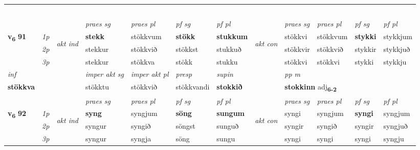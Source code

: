 \begin{longtable}[l]{X>{\footnotesize\itshape}llXXXXlXXXX}
\midrule
  & \\*
   & \\*
     & \\*
   & \\*
  & \\
   \midrule
 & &   & \textit{praes sg}  & \textit{praes pl}    & \textit{ pf sg} & \textit{pf pl} & & \textit{praes sg}  & \textit{praes pl}    & \textit{pf sg} & \textit{pf pl }  \\ \cmidrule{4-7} \cmidrule{9-12}
 \multirow{2}{*}{{{\textbf{v{\textsubscript{6}}} \Large{\textbf{91}}}}}  & 1p & \multirow{3}{*}{\begin{turn}{90}\textit{akt ind}\end{turn}} & \textbf{stekk} & stökkvum & \textbf{stökk} & \textbf{stukkum} & \multirow{3}{*}{\begin{turn}{90}\textit{akt con}\end{turn}} &stökkvi & stökkvum & \textbf{stykki} & stykkjum\\*
 & 2p &  &  stekkur  & stökkvið & stökkst & stukkuð & & stökkvir & stökkvið & stykkir & stykkjuð \\*
 & 3p &  & stekkur & stökkva & stökk & stukku & & stökkvi & stökkvi& stykki & stykkju \\*
\cmidrule{4-7} \cmidrule{9-12}

   {\textit{inf}} & &  & \textit{imper akt sg} & \textit{imper akt pl}   & \textit{presp} & \textit{supin}  && \textit{pp m} \\*
  {\textbf{stökkva}} & && stökktu  & stökkvið   & stökkvandi &  \textbf{stokkið}  && \multicolumn{2}{l}{\textbf{stokkinn} adj\textbf{\textsubscript{6-2}}} \\*

\midrule

 & &   & \textit{praes sg}  & \textit{praes pl}    & \textit{ pf sg} & \textit{pf pl} & & \textit{praes sg}  & \textit{praes pl}    & \textit{pf sg} & \textit{pf pl }  \\ \cmidrule{4-7} \cmidrule{9-12}
 \multirow{2}{*}{{{\textbf{v{\textsubscript{6}}} \Large{\textbf{92}}}}}  & 1p & \multirow{3}{*}{\begin{turn}{90}\textit{akt ind}\end{turn}} & \textbf{syng} & syngjum & \textbf{söng} & \textbf{sungum} & \multirow{3}{*}{\begin{turn}{90}\textit{akt con}\end{turn}} &syngi & syngjum & \textbf{syngi} & syngjum\\*
 & 2p &  &  syngur  & syngið & söngst & sunguð & & syngir & syngið & syngir & syngjuð \\*
 & 3p &  & syngur & syngja & söng & sungu & & syngi & syngi& syngi & syngju \\*
\cmidrule{4-7} \cmidrule{9-12}


\end{longtable}
